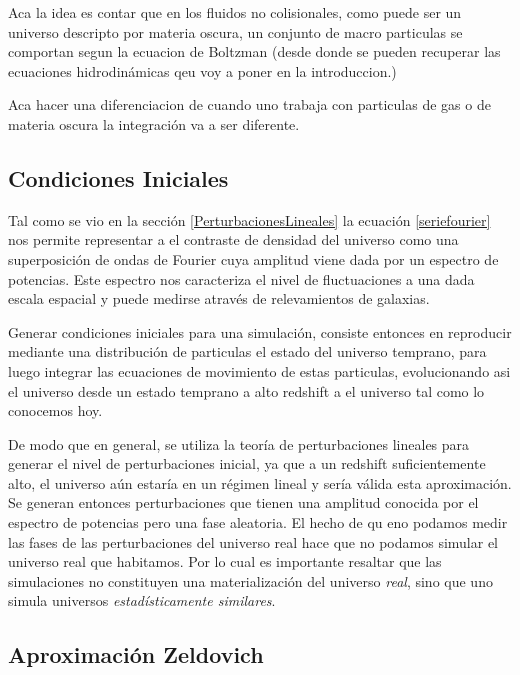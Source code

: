 Aca la idea es contar que en los fluidos no colisionales, como puede ser un universo descripto por materia oscura, un conjunto de macro particulas se comportan segun la ecuacion de Boltzman (desde donde se pueden recuperar las ecuaciones hidrodin\'amicas qeu voy a poner en la introduccion.)

Aca hacer una diferenciacion de cuando uno trabaja con particulas de gas o de materia oscura la integraci\'on va a ser diferente. 




\subsection{Condiciones Iniciales}
Tal como se vio en la secci\'on \ref{PerturbacionesLineales} la ecuaci\'on \ref{seriefourier}  nos permite representar a el contraste de densidad del universo como una superposici\'on de ondas de Fourier cuya amplitud viene dada por un espectro de potencias. Este espectro nos caracteriza el nivel de fluctuaciones a una dada escala espacial y puede medirse atrav\'es de relevamientos de galaxias. 

Generar condiciones iniciales para una simulaci\'on, consiste entonces en reproducir mediante una distribuci\'on de particulas el estado del universo temprano, para luego integrar las ecuaciones de movimiento de estas particulas, evolucionando asi el universo desde un estado temprano a alto redshift a el universo tal como lo conocemos hoy. 

De modo que en general, se utiliza la teor\'ia de perturbaciones lineales para generar el nivel de perturbaciones inicial, ya que a un redshift suficientemente alto, el universo a\'un estar\'ia en un r\'egimen lineal y ser\'ia v\'alida esta aproximaci\'on. Se generan entonces perturbaciones que tienen una amplitud conocida por el espectro de potencias pero una fase aleatoria. El hecho de qu eno podamos medir las fases de las perturbaciones del universo real hace que no podamos simular el universo real que habitamos. Por lo cual es importante resaltar que las simulaciones no constituyen una materializaci\'on del universo \textit{real}, sino que uno simula universos \textit{estad\'isticamente similares}. 

\subsection{Aproximaci\'on Zeldovich}

